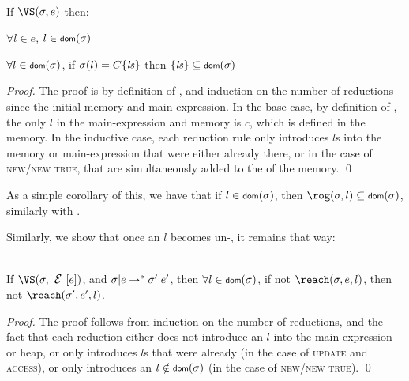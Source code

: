 \SS\begin{Lemma}[No Dangling]\ \\
		\indent If $\VS(\s, e)$ then:
		\begin{iitemize}
			\item $\forall l \in e$, $l \in \dom(\s)$\SS
			\item $\forall l \in \dom(\s)$, if $\sigma(l) = C\{\mathit{ls}\}$ then $\{\ls\} \subseteq \dom(\s)$
		\end{iitemize}
	\end{Lemma}\SS
	\begin{proof}
		The proof is by definition of \VS, and induction on the number of reductions since the initial memory and main-expression.
		In the base case, by definition of \VS, the only $l$ in the main-expression and memory is $c$, which is defined in the memory.
		In the inductive case, each reduction rule only introduces $l$s into the memory or main-expression that were either already there, or in the case of \textsc{new/new true}, that are simultaneously added to the \dom of the memory.
	\qed\end{proof}
	\noindent As a simple corollary of this, we have that if $l \in \dom(\s)$, then $\rog(\s, l) \subseteq \dom(\s)$, similarly with \mrog.

	\LS
	Similarly, we show that once an $l$ becomes un-\reach, it remains that way:
	
\SS\begin{Lemma}\ \\
		\indent If $\VS(\s, \E[e])$, and $\sigma|e \rightarrow^* \sigma'|e'$, then $\forall l \in \dom(\s)$, if not $\reach(\s, e, l)$, then not $\reach(\s', e', l)$.
	\end{Lemma}\SS
	\begin{proof}
		The proof follows from induction on the number of reductions, and the fact that each reduction either does not introduce an $l$ into the main expression or heap,
		or only introduces $l$s that were already \reach (in the case of \textsc{update} and \textsc{access}), or only introduces an $l \notin \dom(\s)$ (in the case of \textsc{new/new true}).
	\qed\end{proof}
	
